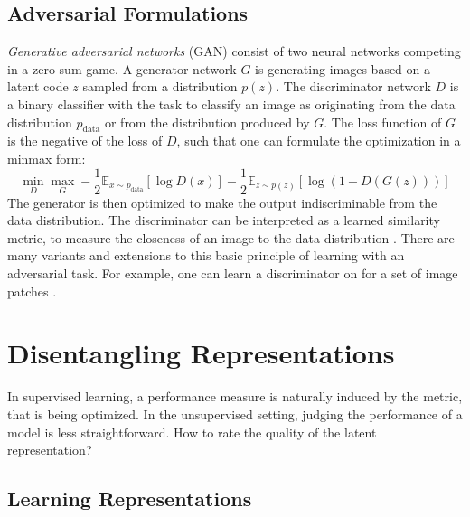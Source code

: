 	\subsection{Adversarial Formulations}\label{sec:adversarial}
		\textit{Generative adversarial networks} (GAN) \cite{goodfellow14gan} consist of two neural networks competing in a zero-sum game. A generator network $G$ is generating images based on a latent code $z$ sampled from a distribution $p(z)$. The discriminator network $D$ is a binary classifier with the task to classify an image as originating from the data distribution $p_{\mathrm{data}}$ or from the distribution produced by $G$. The loss function of $G$ is the negative of the loss of $D$, such that one can formulate the optimization in a minmax form:
		\begin{equation}
			\min_D \max_G - \frac{1}{2} \mathds{E}_{x \sim p_{\mathrm{data}}} [\log D(x)] - \frac{1}{2} \mathds{E}_{z\sim p(z)}[\log (1-D(G(z)))]
		\end{equation}
		The generator is then optimized to make the output indiscriminable from the data distribution.
		The discriminator can be interpreted as a learned similarity metric, to measure the closeness of an image to the data distribution \cite{larsen15vaegan}.
		There are many variants and extensions to this basic principle of learning with an adversarial task. For example, one can learn a discriminator on for a set of image patches \cite{isola17image2image}. 

\section{Disentangling Representations}\label{sec:disentangled}
	In supervised learning, a performance measure is naturally induced by the metric, that is being optimized. In the unsupervised setting, judging the performance of a model is less straightforward.
	How to rate the quality of the latent representation?

	\subsection{Learning Representations}

